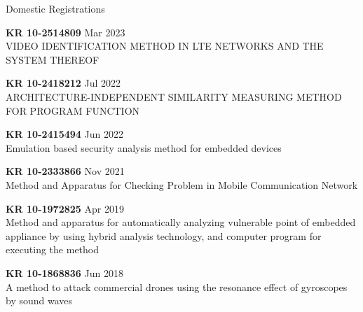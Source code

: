 \begin{timeenumerate}{Domestic Registrations}{}
    \item \textbf{KR 10-2514809} \hfill Mar 2023 \\
    {\small VIDEO IDENTIFICATION METHOD IN LTE NETWORKS AND THE SYSTEM THEREOF}

    \item \textbf{KR 10-2418212} \hfill Jul 2022 \\
    {\small ARCHITECTURE-INDEPENDENT SIMILARITY MEASURING METHOD FOR PROGRAM FUNCTION}
    
    \item \textbf{KR 10-2415494} \hfill Jun 2022 \\
    {\small Emulation based security analysis method for embedded devices}

    \item \textbf{KR 10-2333866} \hfill Nov 2021 \\
    {\small Method and Apparatus for Checking Problem in Mobile Communication Network}

    \item \textbf{KR 10-1972825} \hfill Apr 2019 \\
    {\small Method and apparatus for automatically analyzing vulnerable point
        of embedded appliance by using hybrid analysis technology, and computer
        program for executing the method}

    \item \textbf{KR 10-1868836} \hfill Jun 2018 \\
    {\small A method to attack commercial drones using the resonance effect of
    gyroscopes by sound waves}
\end{timeenumerate}

